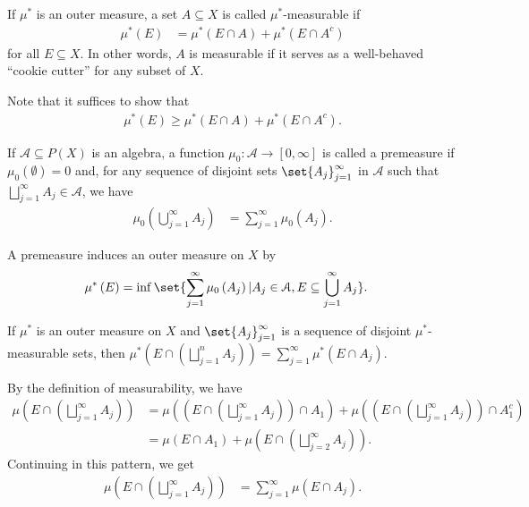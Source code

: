 \documentclass[10pt]{mypackage}
\begin{document}
\begin{definition}
  If $\mu^{\ast}$ is an outer measure, a set $A\subseteq X$ is called $\mu^{\ast}$-measurable if
  \begin{align*}
    \mu^{\ast}\left(E\right) &= \mu^{\ast}\left(E\cap A\right) + \mu^{\ast}\left(E\cap A^{c}\right)
  \end{align*}
  for all $E\subseteq X$. In other words, $A$ is measurable if it serves as a well-behaved ``cookie cutter'' for any subset of $X$.\newline

  Note that it suffices to show that
  \begin{align*}
    \mu^{\ast}\left(E\right) \geq \mu^{\ast}\left(E\cap A\right) + \mu^{\ast}\left(E\cap A^{c}\right).
  \end{align*}
\end{definition}
\begin{definition}
  If $\mathcal{A}\subseteq P(X)$ is an algebra, a function $\mu_0\colon \mathcal{A}\rightarrow [0,\infty]$ is called a premeasure if $\mu_0\left( \emptyset \right) = 0$ and, for any sequence of disjoint sets $\set{A_j}_{j=1}^{\infty}$ in $\mathcal{A}$ such that $\bigsqcup_{j=1}^{\infty}A_j\in \mathcal{A}$, we have
  \begin{align*}
    \mu_0\left( \bigcup_{j=1}^{\infty}A_j \right) &= \sum_{j=1}^{\infty}\mu_0\left( A_j \right).
  \end{align*}
\end{definition}
A premeasure induces an outer measure on $X$ by
\begin{align*}
  \mu^{\ast}\left( E \right) &= \inf\set{\sum_{j=1}^{\infty}\mu_0\left( A_j \right) | A_j\in \mathcal{A},E\subseteq \bigcup_{j=1}^{\infty}A_j}.
\end{align*}
\begin{exercise}[Exercise 17]
  If $\mu^{\ast}$ is an outer measure on $X$ and $\set{A_j}_{j=1}^{\infty}$ is a sequence of disjoint $\mu^{\ast}$-measurable sets, then $\mu^{\ast}\left( E\cap \left( \bigsqcup_{j=1}^{n}A_j \right) \right) = \sum_{j=1}^{\infty}\mu^{\ast}\left( E\cap A_j \right)$.
\end{exercise}
\begin{solution}
  By the definition of measurability, we have
  \begin{align*}
    \mu\left( E\cap \left( \bigsqcup_{j=1}^{\infty} A_j \right) \right) &= \mu\left( \left( E\cap \left( \bigsqcup_{j=1}^{\infty}A_j \right) \right)\cap A_1 \right) + \mu\left( \left( E\cap\left( \bigsqcup_{j=1}^{\infty}A_j \right) \right)\cap A_1^{c} \right)\\
                                                                        &= \mu\left( E\cap A_1 \right) + \mu\left( E\cap \left( \bigsqcup_{j=2}^{\infty}A_j \right) \right).
  \end{align*}
  Continuing in this pattern, we get
  \begin{align*}
    \mu\left( E\cap \left( \bigsqcup_{j=1}^{\infty}A_j \right) \right) &= \sum_{j=1}^{\infty} \mu\left( E\cap A_j \right).
  \end{align*}
\end{solution}
\end{document}
